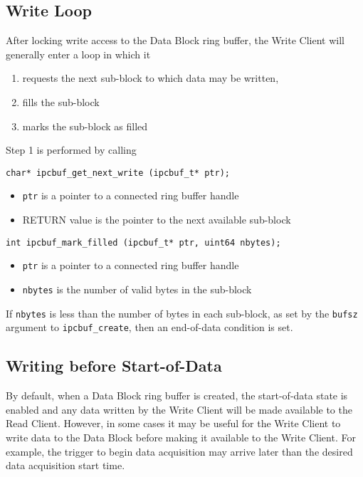 \subsection{Write Loop}

After locking write access to the Data Block ring buffer, the Write
Client will generally enter a loop in which it
\begin{enumerate}
\item requests the next sub-block to which data may be written, 
\vspace{-2mm}
\item fills the sub-block
\vspace{-2mm}
\item marks the sub-block as filled
\end{enumerate}
Step 1 is performed by calling
\begin{verbatim}
char* ipcbuf_get_next_write (ipcbuf_t* ptr);
\end{verbatim}
\vspace{-6mm}
\begin{itemize}
\item {\tt ptr} is a pointer to a connected ring buffer handle
\vspace{-2mm}
\item RETURN value is the pointer to the next available sub-block
\end{itemize}
\begin{verbatim}
int ipcbuf_mark_filled (ipcbuf_t* ptr, uint64 nbytes);
\end{verbatim}
\vspace{-6mm}
\begin{itemize}
\item {\tt ptr} is a pointer to a connected ring buffer handle
\vspace{-2mm}
\item {\tt nbytes} is the number of valid bytes in the sub-block
\end{itemize}

If {\tt nbytes} is less than the number of bytes in each sub-block, as
set by the {\tt bufsz} argument to {\tt ipcbuf\_create}, then an
end-of-data condition is set.

\subsection{Writing before Start-of-Data}

By default, when a Data Block ring buffer is created, the
start-of-data state is enabled and any data written by the Write
Client will be made available to the Read Client.  However, in some
cases it may be useful for the Write Client to write data to the Data
Block before making it available to the Write Client.  For example,
the trigger to begin data acquisition may arrive later than the
desired data acquisition start time.

